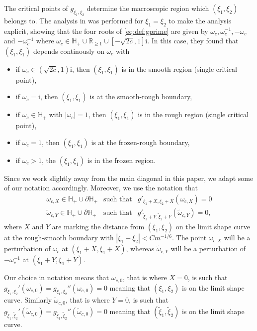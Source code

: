 \documentclass[11pt,twoside]{amsart}
\theoremstyle{plain}
\numberwithin{quest}{section}
\theoremstyle{remark}
\numberwithin{rem}{section}
\theoremstyle{definition}
\begin{document}
	The critical points of $g_{\xi_1,\xi_2}$ determine the macroscopic region which $(\xi_1,\xi_2)$ belongs to. The analysis in \cite{CJ16} was performed for $\xi_1=\xi_2$ to make the analysis explicit, showing that  the four roots of \eqref{eq:def:gprime} are given by $\omega_c, \omega^{-1}_c, -\omega_c$ and $-\omega_c^{-1}$ where $\omega_c \in \mathbb{H}_+\cup \mathbb{R}_{\geq 1} \cup [-\sqrt{2c},1]\mathrm{i}$.  In this case, they found that $(\xi_1,\xi_1)$ depends continously on $\omega_c$ with
   \begin{itemize}
\item  if $\omega_c \in (\sqrt{2c},1)\mathrm{i} $, then $(\xi_1,\xi_1)$ is in the smooth region (single critical point),
      \item if $\omega_c =\mathrm{i} $, then $(\xi_1,\xi_1)$ is at the smooth-rough boundary,  
 \item  if $\omega_c \in \mathbb{H}_+ $ with $|\omega_c|=1$, then $(\xi_1,\xi_1)$ is in the rough region (single critical point),
 \item if $\omega_c =1 $, then $(\xi_1,\xi_1)$ is at the frozen-rough boundary,
 \item if $\omega_c >1$, the $(\xi_1,\xi_1)$ is in the frozen region. 
   \end{itemize}
   



   Since we work slightly away from the main diagonal in this paper,  we adapt some of our notation accordingly.  Moreover, we use 
the notation that
	\begin{equation}\label{eq:def:omegacX}
		\begin{array}{lll}
			\omega_{c,X}\in \mathbb{H}_+\cup \partial \mathbb{H}_+ &\mbox{such that}& g'_{\xi_1+X,\xi_2+X}(\omega_{c,X})=0\\
			\tilde{\omega}_{c,Y}\in \mathbb{H}_+\cup \partial \mathbb{H}_+&\mbox{such that}& g'_{\tilde{\xi}_1+Y,\tilde{\xi}_2+Y}(\tilde{\omega}_{c,Y})=0,
		\end{array}
	\end{equation} 
   where $X$ and $Y$ are marking the distance from $(\xi_1,\xi_2)$ on the limit shape curve at the rough-smooth boundary with $|\xi_1-  \xi_2|< Cm^{-1/6}$. The point $\omega_{c, X}$ will be a perturbation of  $\omega_c$ at $(\xi_1 + X, \xi_1 + X)$, whereas $\tilde \omega_{c, Y}$ will be a perturbation of  $-\omega_c^{-1}$ at $(\xi_1+Y, \xi_1+Y)$.

   
	Our choice in notation means that $\omega_{c,0}$, that is where $X=0$, is such that  $g_{\xi_1,\xi_2}'(\omega_{c,0})=g_{\xi_1,\xi_2}''(\omega_{c,0})=0$ meaning that $(\xi_1,\xi_2)$ is on the limit shape curve. Similarly $\tilde{\omega}_{c,0}$, that is where $Y=0$, is such that  $g_{\tilde{\xi}_1,\tilde{\xi}_2}'(\tilde{\omega}_{c,0})=g_{\tilde{\xi}_1,\tilde{\xi}_2}''(\tilde{\omega}_{c,0})=0$ meaning that $(\tilde{\xi}_1,\tilde{\xi}_2)$ is on the limit shape curve.  
	
\end{document}

